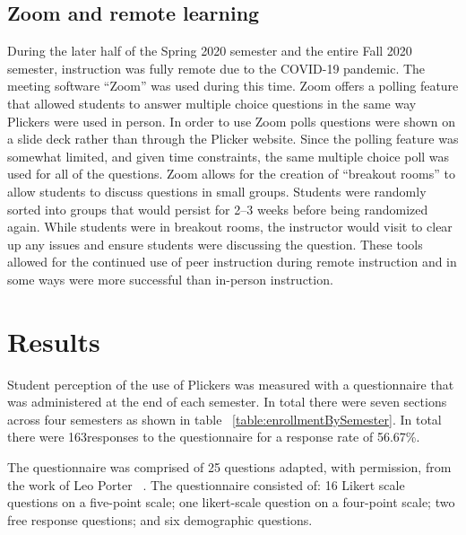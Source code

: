 \documentclass[12pt]{article}
\newcommand\sampleSize{163}
\begin{document}
\subsection{Zoom and remote learning}
During the later half of the Spring 2020 semester and the entire Fall 2020 semester, instruction was fully remote due to the COVID-19 pandemic. The meeting software ``Zoom''  was used during this time. Zoom offers a polling feature that allowed students to answer multiple choice questions in the same way Plickers were used in person. In order to use Zoom polls questions were shown on a slide deck rather than through the Plicker website. Since the polling feature was somewhat limited, and given time constraints, the same multiple choice poll was used for all of the questions. 
Zoom allows for the creation of ``breakout rooms'' to allow students to discuss questions in small groups. Students were randomly sorted into groups that would persist for 2–3 weeks before being randomized again. While students were in breakout rooms, the instructor would visit to clear up any issues and ensure students were discussing the question. These tools allowed for the continued use of peer instruction during remote instruction and in some ways were more successful than in-person instruction.

\section{Results}

Student perception of the use of Plickers was measured with a questionnaire that was administered at the end of each semester. In total there were seven sections across four semesters as shown in table ~\ref{table:enrollmentBySemester}. In total there were \sampleSize responses to the questionnaire for a response rate of  56.67\%.

The questionnaire was comprised of 25 questions adapted, with permission, from the work of Leo Porter ~\cite{porterPeerInstructionStudents2011}. The questionnaire consisted of: 16 Likert scale questions on a five-point scale; one likert-scale question on a four-point scale;  two free response questions; and six demographic questions. 
\end{document}

